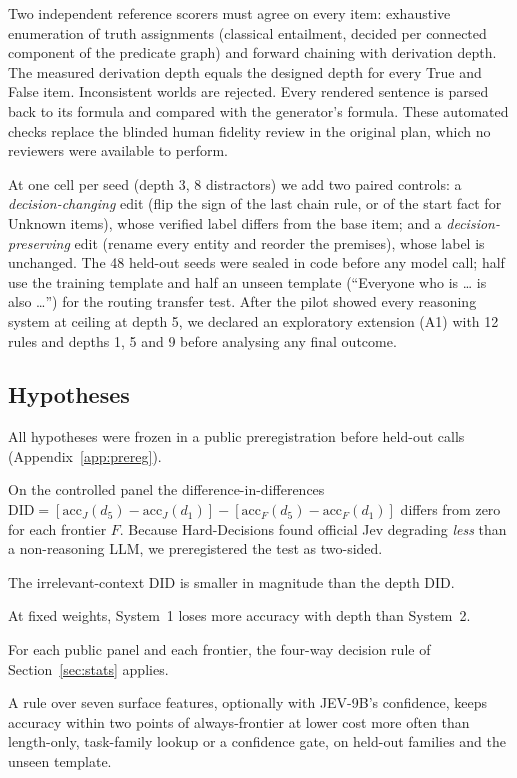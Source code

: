 Two independent reference scorers must agree on every item: exhaustive enumeration of truth assignments (classical entailment, decided per connected component of the predicate graph) and forward chaining with derivation depth.
The measured derivation depth equals the designed depth for every True and False item.
Inconsistent worlds are rejected.
Every rendered sentence is parsed back to its formula and compared with the generator's formula.
These automated checks replace the blinded human fidelity review in the original plan, which no reviewers were available to perform.

At one cell per seed (depth 3, 8 distractors) we add two paired controls: a \emph{decision-changing} edit (flip the sign of the last chain rule, or of the start fact for Unknown items), whose verified label differs from the base item; and a \emph{decision-preserving} edit (rename every entity and reorder the premises), whose label is unchanged.
The 48 held-out seeds were sealed in code before any model call; half use the training template and half an unseen template (``Everyone who is \ldots{} is also \ldots'') for the routing transfer test.
After the pilot showed every reasoning system at ceiling at depth 5, we declared an exploratory extension (A1) with 12 rules and depths 1, 5 and 9 before analysing any final outcome.

\subsection{Hypotheses}
\label{sec:hypotheses}
All hypotheses were frozen in a public preregistration before held-out calls (Appendix~\ref{app:prereg}).
\begin{description}[leftmargin=1.2em,itemsep=2pt]
\item[H1 (depth $\times$ system, two-sided).] On the controlled panel the difference-in-differences $\mathrm{DID}=[\mathrm{acc}_J(d_5)-\mathrm{acc}_J(d_1)]-[\mathrm{acc}_F(d_5)-\mathrm{acc}_F(d_1)]$ differs from zero for each frontier $F$. Because Hard-Decisions found official Jev degrading \emph{less} than a non-reasoning LLM, we preregistered the test as two-sided.
\item[H1b (length is not the explanation).] The irrelevant-context DID is smaller in magnitude than the depth DID.
\item[H1c (mechanism).] At fixed weights, System~1 loses more accuracy with depth than System~2.
\item[H2 (deployment conclusions).] For each public panel and each frontier, the four-way decision rule of Section~\ref{sec:stats} applies.
\item[H3 (selection rule).] A rule over seven surface features, optionally with JEV-9B's confidence, keeps accuracy within two points of always-frontier at lower cost more often than length-only, task-family lookup or a confidence gate, on held-out families and the unseen template.
\end{description}
